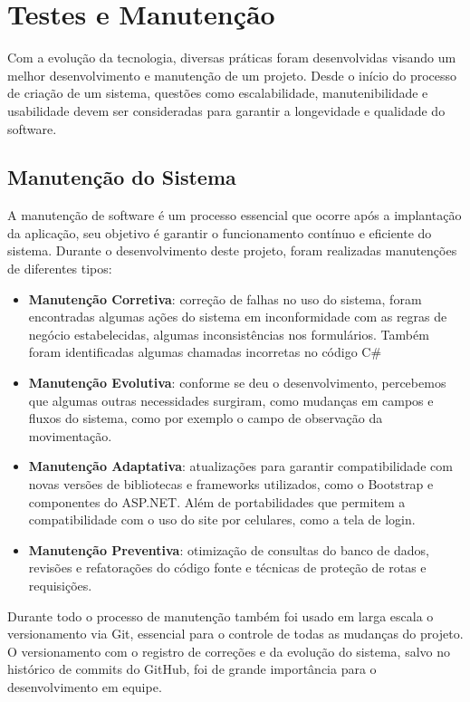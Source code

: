 \documentclass[
	12pt,				%
	openany,			%
	twoside,			%
	a4paper,			%
	english,			%
	brazil				%
	]{abntex2}
\begin{document}
\section{Testes e Manutenção}
Com a evolução da tecnologia, diversas práticas foram desenvolvidas visando um melhor desenvolvimento e manutenção de um projeto. Desde o início do processo de criação de um sistema, questões como escalabilidade, manutenibilidade e usabilidade devem ser consideradas para garantir a longevidade e qualidade do software.

\subsection{Manutenção do Sistema}

A manutenção de software é um processo essencial que ocorre após a implantação da aplicação, seu objetivo é garantir o funcionamento contínuo e eficiente do sistema. Durante o desenvolvimento deste projeto, foram realizadas manutenções de diferentes tipos:

\begin{itemize}
    \item \textbf{Manutenção Corretiva}: correção de falhas no uso do sistema, foram encontradas algumas ações do sistema em inconformidade com as regras de negócio estabelecidas, algumas inconsistências nos formulários. Também foram identificadas algumas chamadas incorretas no código C\#  
    \item \textbf{Manutenção Evolutiva}: conforme se deu o desenvolvimento, percebemos que algumas outras necessidades surgiram, como mudanças em campos e fluxos do sistema, como por exemplo o campo de observação da movimentação.
    \item \textbf{Manutenção Adaptativa}: atualizações para garantir compatibilidade com novas versões de bibliotecas e frameworks utilizados, como o Bootstrap e componentes do ASP.NET. Além de portabilidades que permitem a compatibilidade com o uso do site por celulares, como a tela de login.
    \item \textbf{Manutenção Preventiva}: otimização de consultas do banco de dados, revisões e refatorações do código fonte e técnicas de proteção de rotas e requisições.
\end{itemize}

Durante todo o processo de manutenção também foi usado em larga escala o versionamento via Git, essencial para o controle de todas as mudanças do projeto. O versionamento com o registro de correções e da evolução do sistema, salvo no histórico de commits do GitHub, foi de grande importância para o desenvolvimento em equipe.
\end{document}
